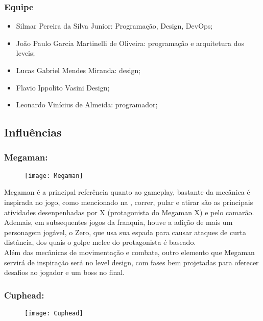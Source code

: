     \subsubsection{Equipe}
        \begin{itemize}
            \item Silmar Pereira da Silva Junior: Programação, Design, DevOps;
            \item João Paulo Garcia Martinelli de Oliveira: programação e arquitetura dos leveis;
            \item Lucas Gabriel Mendes Miranda: design;
            \item Flavio Ippolito Vasini Design;
            \item Leonardo Vinícius de Almeida: programador;
        \end{itemize}

    \subsection{Influências}%
        \subsubsection{Megaman:}
        \label{sec:influencias:megaman}
            \begin{figure}[H]
                \texttt{[image: Megaman]}
            \centering
            \end{figure}

        Megaman é a principal referência quanto ao gameplay, bastante da mecânica é inspirada no jogo, como mencionado na , correr, pular e atirar são as principais atividades desenpenhadas por X (protagonista do Megaman X) e pelo camarão. Ademais, em subsequentes jogos da franquia, houve a adição de mais um personagem jogável, o Zero, que usa sua espada para causar ataques de curta distância, dos quais o golpe melee do protagonista é baseado.\\
        Além das mecânicas de movimentação e combate, outro elemento que Megaman servirá de inspiração será no level design, com fases bem projetadas para oferecer desafios ao jogador e um boss no final.\\

        \subsubsection{Cuphead:}
            \begin{figure}[H]
                \texttt{[image: Cuphead]}
            \centering
            \end{figure}

